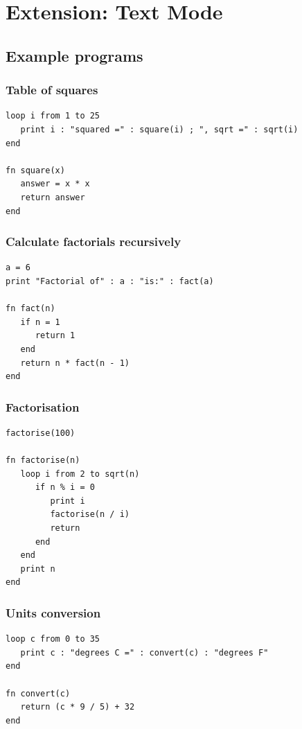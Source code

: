 \documentclass[12pt,a4paper,twoside]{article}
\renewcommand{\_}{\texttt{\symbol{95}}}
\begin{document}
\section{Extension: Text Mode}\label{sec:text-mode}

\subsection{Example programs}

\subsubsection*{Table of squares}

\begin{verbatim}
loop i from 1 to 25
   print i : "squared =" : square(i) ; ", sqrt =" : sqrt(i)
end

fn square(x)
   answer = x * x
   return answer
end
\end{verbatim}

\subsubsection*{Calculate factorials recursively}

\begin{verbatim}
a = 6
print "Factorial of" : a : "is:" : fact(a)

fn fact(n)
   if n = 1
      return 1
   end
   return n * fact(n - 1)
end
\end{verbatim}

\subsubsection*{Factorisation}

\begin{verbatim}
factorise(100)

fn factorise(n)
   loop i from 2 to sqrt(n)
      if n % i = 0
         print i
         factorise(n / i)
         return
      end
   end
   print n
end
\end{verbatim}

\subsubsection*{Units conversion}

\begin{verbatim}
loop c from 0 to 35
   print c : "degrees C =" : convert(c) : "degrees F"
end

fn convert(c)
   return (c * 9 / 5) + 32
end
\end{verbatim}
\end{document}
